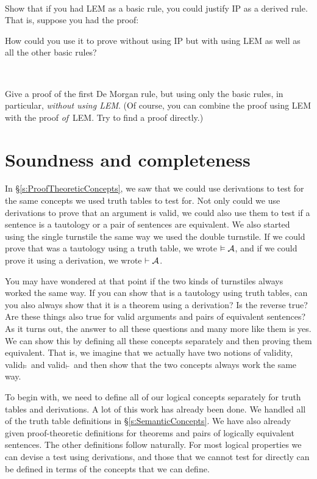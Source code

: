 \

\problempart
Show that if you had LEM as a basic rule, you could justify IP as a derived rule. That is, suppose you had the proof:
\begin{fitchproof}
  \open
  \close
\end{fitchproof}
How could you use it to prove  without using IP but with using LEM as well as all the other basic rules?

\

\problempart
Give a proof of the first De Morgan rule, but using only the basic rules, in particular, \emph{without using LEM}. (Of course, you can combine the proof using LEM with the proof \emph{of}~LEM. Try to find a proof directly.)

\chapter{Soundness and completeness}
\label{sec:soundness_and_completeness}

In \S\ref{s:ProofTheoreticConcepts}, we saw that we could use derivations to test for the same concepts we used truth tables to test for. Not only could we use derivations to prove that an argument is valid, we could also use them to test if a sentence is a tautology or a pair of sentences are equivalent. We also started using the single turnstile the same way we used the double turnstile. If we could prove that  was a tautology using a truth table, we wrote $\vDash \mathcal{A}$, and if we could prove it using a derivation, we wrote $\vdash \mathcal{A}$.

You may have wondered at that point if the two kinds of turnstiles always worked the same way. If you can show that  is a tautology using truth tables, can you also always show that it is a theorem using a derivation? Is the reverse true? Are these things also true for valid arguments and pairs of equivalent sentences? As it turns out, the answer to all these questions and many more like them is yes. We can show this by defining all these concepts separately and then proving them equivalent. That is, we imagine that we actually have two notions of validity, valid$_{\vDash}$ and  valid$_{\vdash}$ and then show that the two concepts always work the same way.

To begin with, we need to define all of our logical concepts separately for truth tables and derivations. A lot of this work has already been done. We handled all of the truth table definitions in \S\ref{s:SemanticConcepts}. We have also already given proof-theoretic definitions for theorems and pairs of logically equivalent sentences. The other definitions follow naturally. For most logical properties we can devise a test using derivations, and those that we cannot test for directly can be defined in terms of the concepts that we can define.


